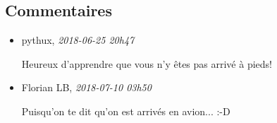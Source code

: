 \hypertarget{commentaires}{%
\subsection{Commentaires}\label{commentaires}}

\begin{itemize}
\item
  pythux, \emph{2018-06-25 20h47}

  Heureux d'apprendre que vous n'y êtes pas arrivé à pieds!
\item
  Florian LB, \emph{2018-07-10 03h50}

  Puisqu'on te dit qu'on est arrivés en avion... :-D
\end{itemize}
